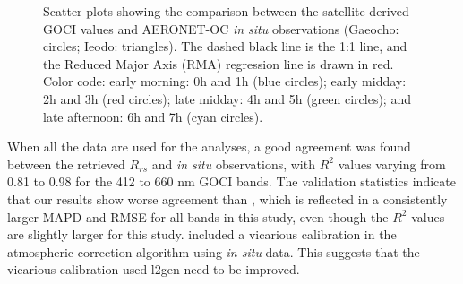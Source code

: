 \documentclass[onecolumn,3p,letterpaper,11pt]{elsarticle}
\begin{document}
\begin{figure}[H]
    \internallinenumbers
    \caption{Scatter plots showing the comparison between the satellite-derived GOCI values and AERONET-OC {\it in situ} observations (Gaeocho: circles; Ieodo: triangles). The dashed black line is the 1:1 line, and the Reduced Major Axis (RMA) regression line is drawn in red. Color code: early morning: 0h and 1h (blue circles); early midday: 2h and 3h (red circles); late midday: 4h and 5h (green circles); and late afternoon: 6h and 7h (cyan circles). \label{fig:GOCI_AERO} } 
\end{figure}

When all the data are used for the analyses, a good agreement was found between the retrieved $R_{rs}$ and {\it in situ} observations, with $R^2$ values varying from 0.81 to 0.98 for the 412 to 660 nm GOCI bands. 
The validation statistics indicate that our results show worse agreement than \citet{Ahn2015}, which is reflected in a consistently larger MAPD and RMSE for all bands in this study, even though the $R^2$ values are slightly larger for this study. \citet{Ahn2015} included a vicarious calibration in the atmospheric correction algorithm using {\it in situ} data. This suggests that the vicarious calibration used l2gen need to be improved.
 

\end{document}
